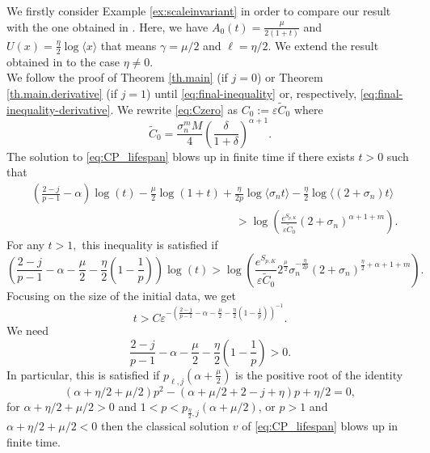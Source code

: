\documentclass[11pt,reqno]{amsart}
\theoremstyle{definition}
\numberwithin{equation}{section}
\newcommand{\e}{\varepsilon}
\begin{document}
We firstly consider Example \ref{ex:scaleinvariant} in order to compare our result with the one obtained in \cite{CGL2021}. Here, we have $A_0(t)=\frac{\mu}{2(1+t)}$ and $U(x)=\frac{\eta}{2}\log\langle x \rangle$ that means $\gamma=\mu/2$ and $\ell=\eta/2$. We extend the result obtained in \cite{CGL2021} to the case $\eta\neq0.$ \\
%
We follow the proof of Theorem \ref{th.main} (if $j=0$) or Theorem \ref{th.main.derivative} (if $j=1$) until \eqref{eq:final-inequality} or, respectively, \eqref{eq:final-inequality-derivative}.  We rewrite \eqref{eq:Czero} as $C_0:=\varepsilon \tilde C_0$ where
\begin{equation*}
\tilde C_0=\frac{\sigma_n^m M}{4}\left(\frac{\delta}{1+\delta}\right)^{\alpha+1}.
\end{equation*}
%
The solution to \eqref{eq:CP_lifespan} blows up in finite time if there exists $t>0$ such that
\begin{equation}
\begin{aligned}
   &\left(\frac{2-j}{p-1}-\alpha\right)\log(t)-\frac{\mu}{2}\log(1+t)+ \frac{\eta}{2p}\log\langle \sigma_n t \rangle- \frac{\eta}{2}\log\langle (2+\sigma_n) t \rangle\\ &\hspace{18em}>\log\left(\frac{e^{S_{p,K}}}{\e \tilde C_0}(2+\sigma_n)^{\alpha+1+m}\right).
\end{aligned}
\end{equation}
For any $t>1,$ this inequality is satisfied if  
%
\begin{equation}
\left(\frac{2-j}{p-1}-\alpha-\frac{\mu}{2}-\frac{\eta}{2}\left(1-\frac{1}{p}\right)\right)\log(t)>\log\left(\frac{e^{S_{p,K}}}{\e \tilde C_0}2^\frac{\mu}{2}\sigma_n^{-\frac{\eta}{2p}}(2+\sigma_n)^{\frac{\eta}{2}+\alpha+1+m}\right).
\end{equation}
Focusing on the size of the initial data, we get
%
\begin{equation}
t>C\varepsilon^{-\left(\frac{2-j}{p-1}-\alpha-\frac{\mu}{2}-\frac{\eta}{2}\left(1-\frac{1}{p}\right)\right)^{-1}}.
\end{equation}
%
We need 
\[ \frac{2-j}{p-1}-\alpha-\frac{\mu}{2}-\frac{\eta}{2}\left(1-\frac{1}{p}\right)>0.\]
%
In particular, this is satisfied if $p_{\ell,j}\left(\alpha+\frac{\mu}{2}\right)$ is the positive root of the identity
\begin{equation}
(\alpha+\eta/2+\mu/2)p^2-(\alpha+\mu/2+2-j+\eta)p+\eta/2=0,
\end{equation}
%
for $\alpha+\eta/2+\mu/2>0$ and $1<p<p_{\frac{\eta}{2},j}(\alpha+\mu/2)$, or $p>1$ and $\alpha+\eta/2+\mu/2<0$ then the classical solution $v$ of \eqref{eq:CP_lifespan}
blows up in finite time.
\end{document}
